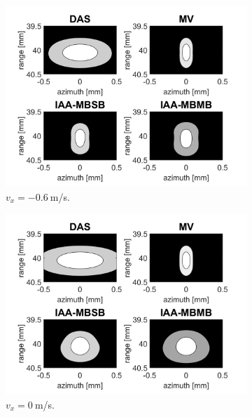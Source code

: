\begin{figure}[ht]
    \centering
    \begin{subfigure}[t]{0.48\linewidth}
        \includegraphics[width=\linewidth]{./images/results/2.1/motion_0_-06.png}
        \caption{$v_x = -0.6~$m/s.}
    \end{subfigure}
    \quad
    \begin{subfigure}[t]{0.48\linewidth}
        \includegraphics[width=\linewidth]{./images/results/2.1/motion_0_0.png}
        \caption{$v_x = 0~$m/s.}
        \label{fig:DAS_idle}
    \end{subfigure}
    \quad
    \begin{subfigure}[t]{0.48\linewidth}

\end{subfigure}
\end{figure}
